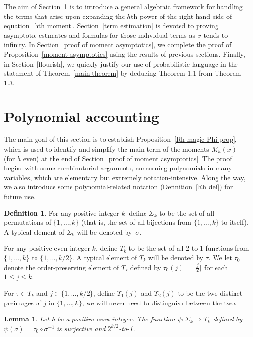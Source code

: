 \documentclass[12pt,reqno]{amsart}
\newtheorem{lemma}[theorem]{Lemma}
\theoremstyle{definition}
\newtheorem{definition}[theorem]{Definition}
\begin{document}
The aim of Section~\ref{polynomial arithmetic} is to introduce a general algebraic framework for handling the terms that arise upon expanding the $h$th power of the right-hand side of equation~\eqref{hth moment}. Section~\ref{term estimation} is devoted to proving asymptotic estimates and formulas for those individual terms as $x$ tends to infinity. In Section~\ref{proof of moment asymptotics}, we complete the proof of Proposition~\ref{moment asymptotics} using the results of previous sections. Finally, in Section~\ref{flourish}, we quickly justify our use of probabilistic language in the statement of Theorem~\ref{main theorem} by deducing Theorem 1.1 from Theorem 1.3.


\section{Polynomial accounting}\label{polynomial arithmetic}

The main goal of this section is to establish Proposition~\ref{Rh magic Phi prop}, which is used to identify and simplify the main term of the moments $M_h(x)$ (for $h$ even) at the end of Section~\ref{proof of moment asymptotics}. The proof begins with some combinatorial arguments, concerning polynomials in many variables, which are elementary but extremely notation-intensive. Along the way, we also introduce some polynomial-related notation (Definition~\ref{Rh def}) for future use.

\begin{definition} \label{Tk def}
For any positive integer $k$, define $\Sigma_k$ to be the set of all permutations of $\{1,\dots,k\}$ (that is, the set of all bijections from $\{1,\dots,k\}$ to itself). A typical element of $\Sigma_k$ will be denoted by~$\sigma$.

For any positive even integer $k$, define $T_k$ to be the set of all 2-to-1 functions from $\{1,\dots,k\}$ to $\{1,\dots,k/2\}$. A typical element of $T_k$ will be denoted by $\tau$. We let $\tau_0$ denote the order-preserving element of $T_k$ defined by $\tau_0(j) = \lceil \frac j2 \rceil$ for each $1\le j\le k$.

For $\tau\in T_k$ and $j\in\{1,\dots,k/2\}$, define $\Upsilon_1(j)$ and $\Upsilon_2(j)$ to be the two distinct preimages of $j$ in $\{1,\dots,k\}$; we will never need to distinguish between the two.
\end{definition}

\begin{lemma} \label{Sigma to T lemma}
Let $k$ be a positive even integer. The function $\psi\colon \Sigma_k\to T_k$ defined by $\psi(\sigma) = \tau_0 \circ \sigma^{-1}$ is surjective and $2^{k/2}$-to-1.
\end{lemma}
\end{document}
